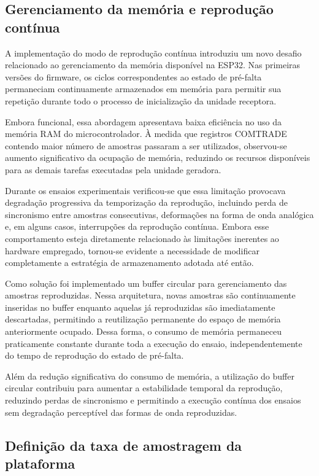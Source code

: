 \subsection{Gerenciamento da memória e reprodução contínua}

A implementação do modo de reprodução contínua introduziu um novo desafio relacionado ao gerenciamento da memória disponível na ESP32. Nas primeiras versões do firmware, os ciclos correspondentes ao estado de pré-falta permaneciam continuamente armazenados em memória para permitir sua repetição durante todo o processo de inicialização da unidade receptora.

Embora funcional, essa abordagem apresentava baixa eficiência no uso da memória RAM do microcontrolador. À medida que registros COMTRADE contendo maior número de amostras passaram a ser utilizados, observou-se aumento significativo da ocupação de memória, reduzindo os recursos disponíveis para as demais tarefas executadas pela unidade geradora.

Durante os ensaios experimentais verificou-se que essa limitação provocava degradação progressiva da temporização da reprodução, incluindo perda de sincronismo entre amostras consecutivas, deformações na forma de onda analógica e, em alguns casos, interrupções da reprodução contínua. Embora esse comportamento esteja diretamente relacionado às limitações inerentes ao hardware empregado, tornou-se evidente a necessidade de modificar completamente a estratégia de armazenamento adotada até então.

Como solução foi implementado um buffer circular para gerenciamento das amostras reproduzidas. Nessa arquitetura, novas amostras são continuamente inseridas no buffer enquanto aquelas já reproduzidas são imediatamente descartadas, permitindo a reutilização permanente do espaço de memória anteriormente ocupado. Dessa forma, o consumo de memória permaneceu praticamente constante durante toda a execução do ensaio, independentemente do tempo de reprodução do estado de pré-falta.

Além da redução significativa do consumo de memória, a utilização do buffer circular contribuiu para aumentar a estabilidade temporal da reprodução, reduzindo perdas de sincronismo e permitindo a execução contínua dos ensaios sem degradação perceptível das formas de onda reproduzidas.

\subsection{Definição da taxa de amostragem da plataforma}

